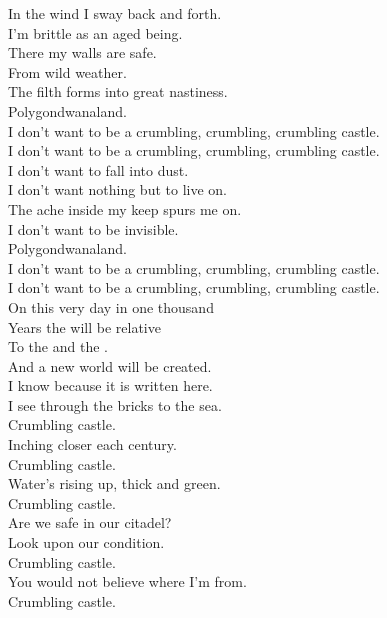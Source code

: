 In the wind I sway back and forth. \\
I'm brittle as an aged  being. \\
There my walls are safe. \\
From wild weather. \\
The filth forms into great nastiness. \\
Polygondwanaland. \\

I don't want to be a crumbling, crumbling, crumbling castle. \\
I don't want to be a crumbling, crumbling, crumbling castle. \\

I don't want to fall into dust. \\
I don't want nothing but to live on. \\
The ache inside my keep spurs me on. \\
I don't want to be invisible. \\
Polygondwanaland. \\

I don't want to be a crumbling, crumbling, crumbling castle. \\
I don't want to be a crumbling, crumbling, crumbling castle. \\

On this very day in one thousand \\
Years the  will be relative \\
To the  and the . \\
And a new world will be created. \\
I know because it is written here. \\

I see through the bricks to the sea. \\
Crumbling castle. \\
Inching closer each century. \\
Crumbling castle. \\
Water's rising up, thick and green. \\
Crumbling castle. \\
Are we safe in our citadel? \\

Look upon our condition. \\
Crumbling castle. \\
You would not believe where I'm from. \\
Crumbling castle. \\

